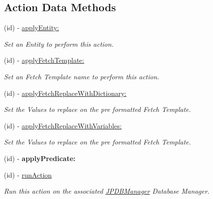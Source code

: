 \subsection*{Action Data Methods}
\begin{DoxyCompactItemize}
\item 
(id) -\/ \hyperlink{interface_j_p_d_b_manager_action_aefef71fec8be541c06102b052e0b3c04}{applyEntity:}
\begin{DoxyCompactList}\small\item\em Set an Entity to perform this action. \item\end{DoxyCompactList}\item 
(id) -\/ \hyperlink{interface_j_p_d_b_manager_action_ac21e1e26b08f892d10e6a434f03958e6}{applyFetchTemplate:}
\begin{DoxyCompactList}\small\item\em Set an Fetch Template name to perform this action. \item\end{DoxyCompactList}\item 
(id) -\/ \hyperlink{interface_j_p_d_b_manager_action_a1f0599e3441beb8b911b9d0f73c89329}{applyFetchReplaceWithDictionary:}
\begin{DoxyCompactList}\small\item\em Set the Values to replace on the pre formatted Fetch Template. \item\end{DoxyCompactList}\item 
(id) -\/ \hyperlink{interface_j_p_d_b_manager_action_a326f7abe356e685297cfa32460dd7101}{applyFetchReplaceWithVariables:}
\begin{DoxyCompactList}\small\item\em Set the Values to replace on the pre formatted Fetch Template. \item\end{DoxyCompactList}\item 
\hypertarget{interface_j_p_d_b_manager_action_a11e31543021bbf876a3d83b16dce0d75}{
(id) -\/ {\bfseries applyPredicate:}}
\label{interface_j_p_d_b_manager_action_a11e31543021bbf876a3d83b16dce0d75}

\item 
\hypertarget{interface_j_p_d_b_manager_action_a949b92949f557892131e135a5cbbffde}{
(id) -\/ \hyperlink{interface_j_p_d_b_manager_action_a949b92949f557892131e135a5cbbffde}{runAction}}
\label{interface_j_p_d_b_manager_action_a949b92949f557892131e135a5cbbffde}

\begin{DoxyCompactList}\small\item\em Run this action on the associated \hyperlink{interface_j_p_d_b_manager}{JPDBManager} Database Manager. \item\end{DoxyCompactList}\end{DoxyCompactItemize}
